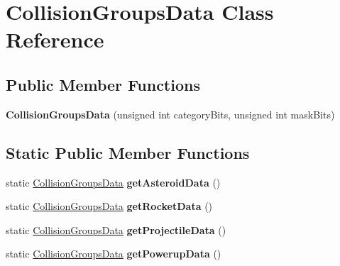 \hypertarget{classCollisionGroupsData}{}\section{Collision\+Groups\+Data Class Reference}
\label{classCollisionGroupsData}
\subsection*{Public Member Functions}
\begin{DoxyCompactItemize}
\item 
{\bfseries Collision\+Groups\+Data} (unsigned int category\+Bits, unsigned int mask\+Bits)\hypertarget{classCollisionGroupsData_a218c0061136e6e2e93db3c958b9bbc00}{}\label{classCollisionGroupsData_a218c0061136e6e2e93db3c958b9bbc00}

\end{DoxyCompactItemize}
\subsection*{Static Public Member Functions}
\begin{DoxyCompactItemize}
\item 
static \hyperlink{classCollisionGroupsData}{Collision\+Groups\+Data} {\bfseries get\+Asteroid\+Data} ()\hypertarget{classCollisionGroupsData_a86d651338c81b5527eb0198943cc668f}{}\label{classCollisionGroupsData_a86d651338c81b5527eb0198943cc668f}

\item 
static \hyperlink{classCollisionGroupsData}{Collision\+Groups\+Data} {\bfseries get\+Rocket\+Data} ()\hypertarget{classCollisionGroupsData_aec98d202dd50071efc45dcf08510fa73}{}\label{classCollisionGroupsData_aec98d202dd50071efc45dcf08510fa73}

\item 
static \hyperlink{classCollisionGroupsData}{Collision\+Groups\+Data} {\bfseries get\+Projectile\+Data} ()\hypertarget{classCollisionGroupsData_ac6cd27485f1aca9d5c1036cb819eb85b}{}\label{classCollisionGroupsData_ac6cd27485f1aca9d5c1036cb819eb85b}

\item 
static \hyperlink{classCollisionGroupsData}{Collision\+Groups\+Data} {\bfseries get\+Powerup\+Data} ()\hypertarget{classCollisionGroupsData_a3cded86803ba1591944e579978c6939d}{}\label{classCollisionGroupsData_a3cded86803ba1591944e579978c6939d}

\end{DoxyCompactItemize}

